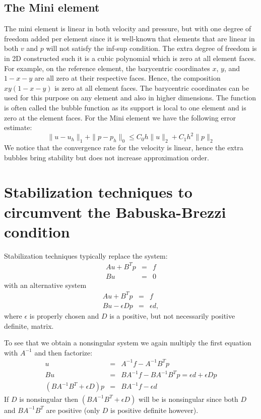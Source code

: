 \subsection{The Mini element}
The mini element is linear in both velocity and pressure, but with one degree of freedom added per element since it is well-known that elements that are linear in both $v$ and $p$ will not satisfy the inf-sup condition. The extra degree of freedom is in 2D constructed such it is a cubic polynomial which is zero at all element faces. 
For example, on the reference element, the barycentric coordinates $x$, $y$, and $1-x-y$ are all zero at their respective faces. Hence, the composition 
$xy(1-x-y)$ is zero at all element faces. 
The barycentric coordinates can be used for this purpose on any element and also in higher dimensions.   
The function is often called the bubble function as its support is local to one element and is zero at the element faces. 
For the Mini element we have the following error estimate:
\[\|u-u_h\|_1 + \|p-p_h\|_0 \le C_0 h\|u\|_{2} + C_1 h^2\|p\|_{2}\]
We notice that the convergence rate for the velocity is linear, hence the extra bubbles bring stability but does not increase approximation
order. 

\section{Stabilization techniques to circumvent the Babuska-Brezzi condition}
Stabilization techniques typically replace the system:
\begin{eqnarray*}
Au + B^Tp &=& f \\
Bu &=& 0
\end{eqnarray*}
with an alternative system
\begin{eqnarray*}
Au + B^Tp &=& f \\
Bu -\epsilon Dp &=& \epsilon d ,
\end{eqnarray*}
where $\epsilon$ is properly chosen and $D$ is a positive, but not necessarily positive definite,  matrix.

To see that we obtain a nonsingular system we again multiply the first
equation with $A^{-1}$ and then factorize:
\begin{eqnarray*}
u &=& A^{-1}f - A^{-1}B^Tp \\
Bu &=& BA^{-1}f - BA^{-1}B^Tp  = \epsilon d + \epsilon Dp \\
(BA^{-1}B^T + \epsilon D)p &=& BA^{-1}f - \epsilon d
\end{eqnarray*}
If $D$ is nonsingular then
$(BA^{-1}B^T + \epsilon D)$ will be is nonsingular since both $D$ and $BA^{-1}B^T$ are positive (only $D$ is positive definite however).

